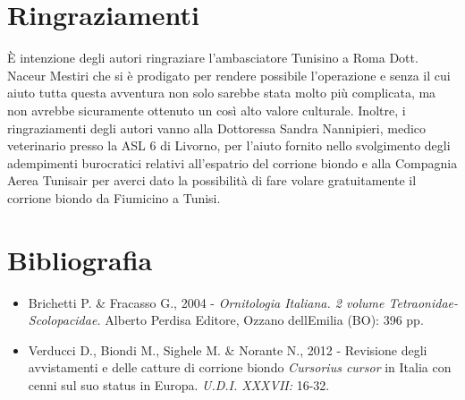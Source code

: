 \section*{Ringraziamenti}

\`E intenzione degli autori ringraziare l{\textquoteright}ambasciatore
Tunisino a Roma Dott. Naceur Mestiri che si \`e prodigato per rendere
possibile l{\textquoteright}operazione e senza il cui aiuto tutta
questa avventura non solo sarebbe stata molto pi\`u complicata, ma non
avrebbe sicuramente ottenuto un cos\`i alto valore culturale. Inoltre,
i ringraziamenti degli autori vanno alla Dottoressa Sandra Nannipieri,
medico veterinario presso la ASL 6 di Livorno, per
l{\textquoteright}aiuto fornito nello svolgimento degli adempimenti
burocratici relativi all{\textquoteright}espatrio del corrione biondo e
alla Compagnia Aerea Tunisair per averci dato la possibilit\`a di fare
volare gratuitamente il corrione biondo da Fiumicino a Tunisi.



\section*{Bibliografia}
\begin{itemize}\itemsep0pt
	\item Brichetti P. \& Fracasso G., 2004 - \textit{Ornitologia Italiana.
2{\textdegree} volume Tetraonidae-Scolopacidae.} Alberto Perdisa
Editore, Ozzano dell{\textquotesingle}Emilia (BO): 396 pp.

	\item Verducci D., Biondi M., Sighele M. \& Norante N., 2012 - Revisione degli
avvistamenti e delle catture di corrione biondo \textit{Cursorius
cursor} in Italia con cenni sul suo status in Europa. \textit{U.D.I.
XXXVII:} 16-32.
\end{itemize}
